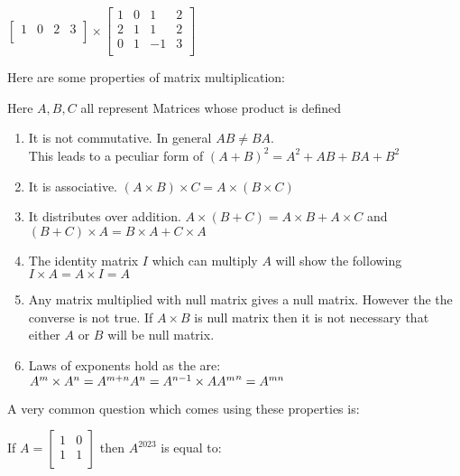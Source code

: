 \begin{example}
    $\begin{bmatrix}
         1 & 0 & 2 & 3\\
    \end{bmatrix} \times \begin{bmatrix}
        1 & 0& 1& 2\\
        2 & 1& 1& 2\\
        0 & 1& -1& 3\\
    \end{bmatrix}$
\end{example}
Here are some properties of matrix multiplication:\\
\begin{theorem}
Here $A,B,C$ all represent Matrices whose product is defined
\begin{enumerate}
    \item It is not commutative. In general $AB \neq BA$.\\
    This leads to a peculiar form of $(A+B)^2=A^2+AB+BA+B^2$
    \item It is associative. $(A \times B) \times C= A \times (B \times C)$
    \item It distributes over addition. $A \times (B + C) = A \times B + A \times C$ and $(B + C) \times A = B \times A + C \times A$
    \item The identity matrix $I$ which can multiply $A$ will show the following $I \times A = A \times I = A$\\
    \item Any matrix multiplied with null matrix gives a null matrix. However the the converse is not true. If $A \times B$ is null matrix then it is not necessary that either $A$ or $B$ will be null matrix.\\
    \item Laws of exponents hold as the are:\\ 
    $A^m \times A^n = A^{m+n}\\
    A^n=A^{n-1} \times A\\
    {A^m}^{n}=A^{mn}$
\end{enumerate}
\end{theorem}
A very common question which comes using these properties is:\\
\begin{example}
    If $A = \begin{bmatrix}
        1 & 0\\
        1 & 1\\
    \end{bmatrix}$ then $A^{2023}$ is equal to:
\end{example}
